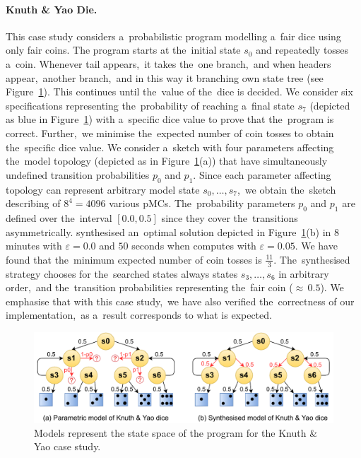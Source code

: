 \paragraph{Knuth \& Yao Die.}
This case study considers a~probabilistic program modelling a~fair dice using only fair coins.
The program starts at the~initial state $s_0$ and repeatedly tosses a~coin.
Whenever tail appears,~it takes the~one branch,~and when headers appear,~another branch,~and in this way it branching own state tree (see Figure~\ref{fig:kydie}).
This continues until the~value of the~dice is decided.
We consider six specifications representing the~probability of reaching a~final state $s_7$ (depicted as blue in Figure~\ref{fig:kydie}) with a~specific dice value to prove that the~program is correct.
Further,~we minimise the~expected number of coin tosses to obtain the~specific dice value.
We consider a~sketch with four parameters affecting the~model topology (depicted as  in Figure~\ref{fig:kydie}(a)) that have simultaneously undefined transition probabilities $p_0$ and $p_1$.
Since each parameter affecting topology can represent arbitrary model state $s_0, \dots, s_7$,~we obtain the~sketch describing of $8^4 = 4096$ various pMCs.
The~probability parameters $p_0$ and $p_1$ are defined over the~interval $[0.0, 0.5]$ since they cover the~transitions asymmetrically.
\toolname{} synthesised an~optimal solution depicted in Figure~\ref{fig:kydie}(b) in $8$ minutes with $\varepsilon = 0.0$ and $50$ seconds when computes with $\varepsilon = 0.05$. 
We have found that the~minimum expected number of coin tosses is $\frac{11}{3}$.
The~synthesised strategy chooses for the~searched states always states $s_3, \dots, s_6$ in arbitrary order,~and the~transition probabilities representing the~fair coin (${\approx} \, 0.5$).
We emphasise that with this case study,~we have also verified the~correctness of our implementation,~as a~result corresponds to what is expected.

\begin{figure}[h!]
\centering
\includegraphics[width=1.0\textwidth]{figures/kydie.pdf}
\caption{Models represent the state space of the program for the Knuth \& Yao case study.}%
\label{fig:kydie}%
\end{figure}

